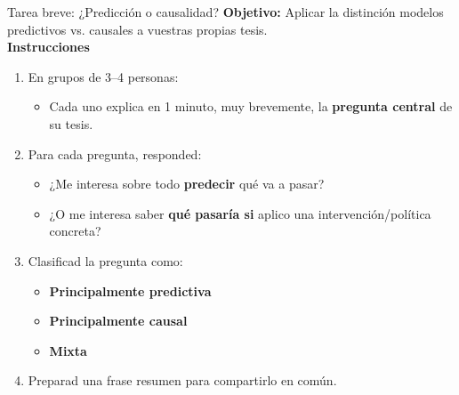 ﻿\documentclass{beamer}
\begin{document}
\begin{frame}{Tarea breve: ¿Predicción o causalidad?}
    \textbf{Objetivo:} Aplicar la distinción modelos predictivos vs. causales 
    a vuestras propias tesis.\\[8pt]

    \textbf{Instrucciones}\\[-2pt]
    \begin{enumerate}
        \item En grupos de 3--4 personas:
        \begin{itemize}
            \item Cada uno explica en 1 minuto, muy brevemente,
            la \textbf{pregunta central} de su tesis.
        \end{itemize}
        \item Para cada pregunta, responded:
        \begin{itemize}
            \item[a)] ¿Me interesa sobre todo \textbf{predecir} qué va a pasar?
            \item[b)] ¿O me interesa saber \textbf{qué pasaría si} aplico
            una intervención/política concreta?
        \end{itemize}
        \item Clasificad la pregunta como:
        \begin{itemize}
            \item \textbf{Principalmente predictiva}
            \item \textbf{Principalmente causal}
            \item \textbf{Mixta}
        \end{itemize}
        \item Preparad una frase resumen para compartirlo en común.
    \end{enumerate}
\end{frame}
\end{document}
